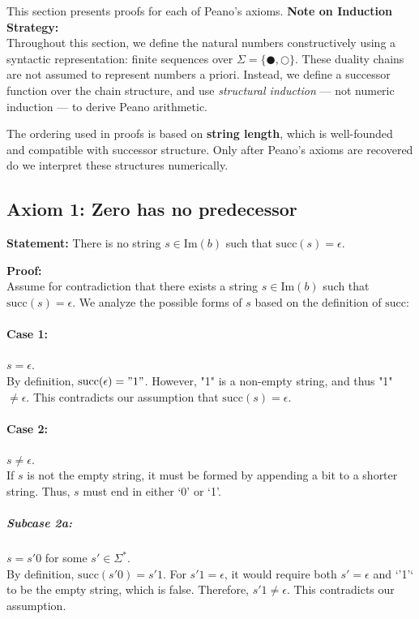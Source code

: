 \documentclass[12pt, a4paper]{article}
\begin{document}
This section presents proofs for each of Peano's axioms. 
\textbf{Note on Induction Strategy:} \\
Throughout this section, we define the natural numbers constructively using a syntactic representation: finite sequences over $\Sigma = \{ \CIRCLE, \Circle \}$. These duality chains are not assumed to represent numbers a priori. Instead, we define a successor function over the chain structure, and use \emph{structural induction} — not numeric induction — to derive Peano arithmetic.

The ordering used in proofs is based on \textbf{string length}, which is well-founded and compatible with successor structure. Only after Peano's axioms are recovered do we interpret these structures numerically.


\subsection*{Axiom 1: Zero has no predecessor}

\textbf{Statement:} There is no string \( s \in \mathrm{Im}(b) \) such that \(\mathrm{succ}(s) = \epsilon\).

\textbf{Proof:} \\
Assume for contradiction that there exists a string \( s \in \mathrm{Im}(b) \) such that \(\mathrm{succ}(s) = \epsilon\). We analyze the possible forms of \( s \) based on the definition of \(\mathrm{succ}\):

\paragraph{Case 1:} \( s = \epsilon \). \\
By definition, \(\mathrm{succ}(\epsilon) = "1"\). However, "1" is a non-empty string, and thus "1" \(\neq \epsilon\). This contradicts our assumption that \(\mathrm{succ}(s) = \epsilon\).

\paragraph{Case 2:} \( s \neq \epsilon \). \\
If \( s \) is not the empty string, it must be formed by appending a bit to a shorter string. Thus, \( s \) must end in either `0' or `1'.

\subparagraph{Subcase 2a:} \( s = s'0 \) for some \( s' \in \Sigma^* \). \\
By definition, \(\mathrm{succ}(s'0) = s'1\). For \( s'1 = \epsilon \), it would require both \( s' = \epsilon \) and `'1'` to be the empty string, which is false. Therefore, \( s'1 \neq \epsilon \). This contradicts our assumption.
\end{document}

